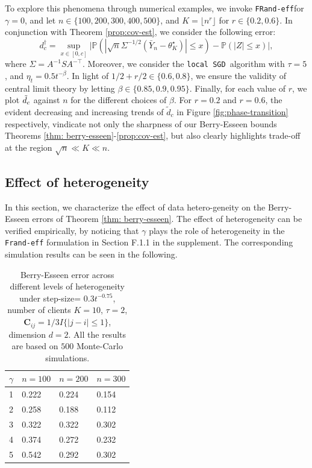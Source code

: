 \documentclass[a4paper,11pt]{article}
\numberwithin{equation}{section}
\theoremstyle{plain}
\theoremstyle{remark}
\newcommand{\DFL}{\texttt{local SGD}}
\newcommand{\minparam}{\theta^\star_K}
\newcommand{\IP}{\mathbb{P}}
\newcommand{\model}{\texttt{FRand-eff}}
\begin{document}
\noindent
To explore this phenomena through numerical examples, we invoke \model for $\gamma=0$, and let $n\in \{100,200,300,400, 500\}$, and $K=\lfloor n^r \rfloor$ for $r\in\{0.2, 0.6\}$. In conjunction with Theorem \ref{prop:cov-est}, we consider the following error:
\[ {d}_c^\dagger=\sup_{x \in [0,c]}\big|\IP(|\sqrt{n}\Sigma^{-1/2}(\bar{Y}_n - \minparam)|\leq x) - \IP(|Z|\leq x)\big|, \]
where $\Sigma=A^{-1}S A^{-\top}$.
Moreover, we consider the \DFL\ algorithm with $\tau=5$, and $\eta_t=0.5 t^{-\beta}$.  In light of $1/2+r/2 \in \{0.6,0.8 \}$, we ensure the validity of central limit theory by letting $\beta \in \{0.85, 0.9, 0.95\}$. Finally, for each value of $r$, we plot $\Tilde{d}_c$ against $n$ for the different choices of $\beta$. For $r=0.2$ and $r=0.6$, the evident decreasing and increasing trends of $\tilde{d}_c$ in Figure \ref{fig:phase-transition} respectively, vindicate not only the sharpness of our Berry-Esseen bounds Theorems \ref{thm: berry-esseen}-\ref{prop:cov-est}, but also clearly highlights trade-off at the region $\sqrt{n} \ll K \ll n$. 

\subsection{Effect of heterogeneity}
In this section, we characterize the effect of data hetero-geneity on the Berry-Esseen errors of Theorem \ref{thm: berry-esseen}. The effect of heterogeneity can be verified empirically, by noticing that $\gamma$ plays the role of heterogeneity in the \texttt{Frand-eff} formulation in Section F.1.1 in the supplement. The corresponding simulation results can be seen in the following.

\begin{table}[H]
\centering
\begin{tabular}{|l|l|l|l|}
\hline
$\gamma$ & $n=100$ & $n=200$ & $n=300$ \\
\hline
1 & 0.222 & 0.224 & 0.154 \\
2 & 0.258 & 0.188 & 0.112 \\
3 & 0.322 & 0.322 & 0.302 \\
4 & 0.374 & 0.272 & 0.232 \\
5 & 0.542 & 0.292 & 0.302 \\
\hline
\end{tabular}
\caption{Berry-Esseen error across different levels of heterogeneity under step-size= $0.3t^{-0.75}$, number of clients $K=10$, $\tau=2$, $\mathbf{C}_{ij}=1/3 I\{|j-i|\leq 1\}$, dimension $d=2$. All the results are based on $500$ Monte-Carlo simulations.}
\end{table}
\end{document}
